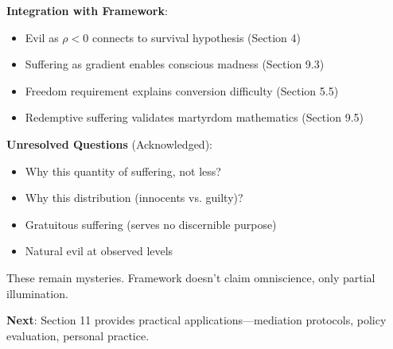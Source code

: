 \documentclass[11pt,a4paper]{article}
\theoremstyle{definition}
\theoremstyle{remark}
\begin{document}
\begin{small}
\begin{enumerate}
\begin{mdframed}[backgroundcolor=green!10,linewidth=2pt,linecolor=green!70!black]
\textbf{Integration with Framework}:
\begin{itemize}[nosep]
    \item Evil as \(\rho < 0\) connects to survival hypothesis (Section 4)
    \item Suffering as gradient enables conscious madness (Section 9.3)
    \item Freedom requirement explains conversion difficulty (Section 5.5)
    \item Redemptive suffering validates martyrdom mathematics (Section 9.5)
\end{itemize}

\textbf{Unresolved Questions} (Acknowledged):
\begin{itemize}[nosep]
    \item Why this quantity of suffering, not less?
    \item Why this distribution (innocents vs. guilty)?
    \item Gratuitous suffering (serves no discernible purpose)
    \item Natural evil at observed levels
\end{itemize}

These remain mysteries. Framework doesn't claim omniscience, only partial illumination.

\textbf{Next}: Section 11 provides practical applications—mediation protocols, policy evaluation, personal practice.
\end{mdframed}

\begin{figure}[H]
\centering
{}
\end{figure}
\end{enumerate}
\end{small}
\end{document}
